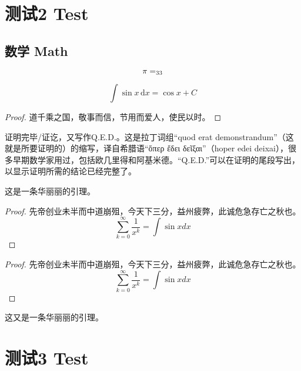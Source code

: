 \documentclass[twoside]{fduthesis}
\begin{document}
\chapter{测试2 Test}
\section{数学 Math}
\[\pi=\sb{33}\]

\[
  \int\sin x\,\mathrm{d}x=\cos x + C
\]

\begin{proof}
道千乘之国，敬事而信，节用而爱人，使民以时。
\end{proof}

\begin{definition}
证明完毕/证讫，又写作Q.E.D.。这是拉丁词组“quod erat demonstrandum”（这就是所要证明的）的缩写，译自希腊语“ὅπερ ἔδει δεῖξαι”（hoper edei deixai），很多早期数学家用过，包括欧几里得和阿基米德。“Q.E.D.”可以在证明的尾段写出，以显示证明所需的结论已经完整了。
\end{definition}

\begin{lemma}
  这是一条华丽丽的引理。
\end{lemma}

\begin{proof}
先帝创业未半而中道崩殂，今天下三分，益州疲弊，此诚危急存亡之秋也。
\begin{equation}
  \sum_{k=0}^{\infty} \frac{1}{x^k} = \int \sin x dx
\end{equation}
\end{proof}

\begin{proof}
先帝创业未半而中道崩殂，今天下三分，益州疲弊，此诚危急存亡之秋也。
\begin{equation*}
  \sum_{k=0}^{\infty} \frac{1}{x^k} = \int \sin x dx
\end{equation*}
\end{proof}

\begin{lemma}
  这又是一条华丽丽的引理。
\end{lemma}

\chapter{测试3 Test}

\end{document}
